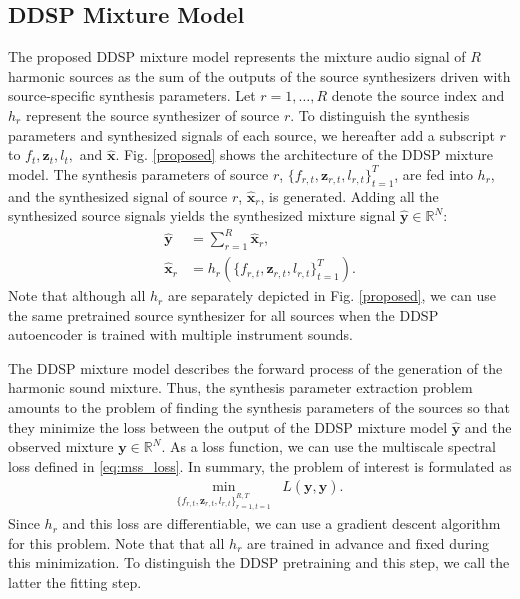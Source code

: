 \documentclass{article}
\def\R{\mathbb{R}}
\begin{document}
\subsection{DDSP Mixture Model}\label{sec:algo}
The proposed DDSP mixture model represents the mixture audio signal of $R$ harmonic sources as the sum of the outputs of the source synthesizers driven with source-specific synthesis parameters.
Let $r=1,\ldots,R$ denote the source index and $h_r$ represent the source synthesizer of source $r$.
To distinguish the synthesis parameters and synthesized signals of each source, we hereafter add a subscript $r$ to $f_t,\bm{z}_t,l_t,$ and $\bm{\hat{x}}$.
Fig. \ref{proposed} shows the architecture of the DDSP mixture model.
The synthesis parameters of source $r$, $\{f_{r,t},\bm{z}_{r,t},l_{r,t}\}_{t=1}^T$, are fed into $h_r$, and the synthesized signal of source $r$, $\bm{\hat{x}}_r$, is generated.
Adding all the synthesized source signals yields the synthesized mixture signal $\bm{\hat{y}}\in\R^{N}$:
\begin{align}
    \bm{\hat{y}} &= \sum_{r=1}^R\bm{\hat{x}}_r
    \label{eq:ddsp_mixture}, \\
    \bm{\hat{x}}_r &= h_r(\{f_{r,t},\bm{z}_{r,t},l_{r,t}\}_{t=1}^T).
    \label{eq:ddsp_r}
\end{align}
Note that although all $h_r$ are separately depicted in Fig. \ref{proposed}, we can use the same pretrained source synthesizer for all sources when the DDSP autoencoder is trained with multiple instrument sounds.

The DDSP mixture model describes the forward process of the generation of the harmonic sound mixture.
Thus, the synthesis parameter extraction problem amounts to the problem of finding the synthesis parameters of the sources so that they minimize the loss between the output of the DDSP mixture model $\bm{\hat{y}}$ and the observed mixture $\bm{y}\in\R^N$.
As a loss function, we can use the multiscale spectral loss defined in \eqref{eq:mss_loss}.
In summary, the problem of interest is formulated as
\begin{align}
\min_{\{f_{r,t},\bm{z}_{r,t},l_{r,t}\}_{r=1,t=1}^{R,T}} & L(\bm{y},\bm{\hat{y}}).
\label{eq:formulation}
\end{align}
Since $h_r$ and this loss are differentiable, we can use a gradient descent algorithm for this problem.
Note that that all $h_r$ are trained in advance and fixed during this minimization.
To distinguish the DDSP pretraining and this step, we call the latter the fitting step.
\end{document}
